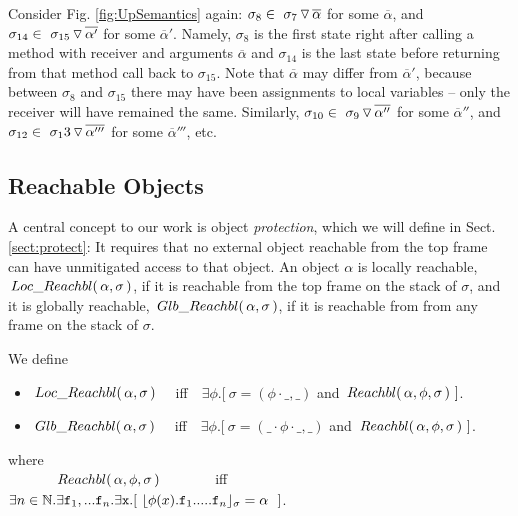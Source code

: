 {\begin{lemma}
\end{lemma}

 

 {Consider Fig. \ref{fig:UpSemantics} again: $\sigma_8\in   \PushS  {\alpha} {\sigma_7}$ for some $\overline \alpha$, and 
 $\sigma_{14}\in\PushS  {\alpha'} {\sigma_{15}}$ for some $\overline \alpha'$. Namely, $\sigma_8$ is the first state right after calling a method with receiver and
 arguments $\overline \alpha$ and $\sigma_{14}$ is the last state before returning from that method call back to $\sigma_{15}$.
Note that $\overline \alpha$ may differ from $\overline \alpha'$, because between $\sigma_8$ and $\sigma_{15}$ there may 
have been assignments to local variables -- only the receiver will have remained the same.
Similarly, 
 $\sigma_{10}\in\PushS  {\alpha''} {\sigma_9}$ for some $\overline \alpha''$, and  $\sigma_{12}\in\PushS  {\alpha'''} {\sigma_13}$ for some $\overline \alpha'''$, etc.
}


  \subsection{{Reachable  Objects}}

 {A central concept to our work is object \emph{protection}, which we will define in   Sect. \ref{sect:protect}: It requires that no external object  
reachable from the top frame  can have unmitigated access to that object.}
%
%
An object $\alpha$ is  locally reachable, $ \LRelevant \alpha \sigma $, if it is reachable from the top frame on the stack of $\sigma$,
and it is globally reachable, $\GRelevant \alpha \sigma$, if it is reachable from from any  frame on the stack of $\sigma$.
 
\begin{definition} We define 
\begin{itemize}
\item
$ \LRelevant \alpha \sigma $ \ \ iff\ \  
$\exists \phi.[\ \sigma=(\phi\cdot\_, \_)$ and $\Relevant \alpha \phi \sigma\ ]$. %
\item
$\GRelevant \alpha \sigma$  \ \ iff\ \  
$\exists \phi.[\ \sigma=(\_\cdot\phi\cdot\_, \_)$ and $\Relevant \alpha \phi \sigma\ ]$. %
\end{itemize}
where\\
$\strut\ \ \ \  \ \ \ \ \ \ \Relevant \alpha \phi \sigma $  \ \ \ \ \ \ \ iff\ \  
$\exists n\in \mathbb{N}.\exists \prg{f}_1,... \prg{f}_n.\exists \prg{x}.[ \ \interpret{\sigma}{\phi(x).\prg{f}_1.....\prg{f}_n} = \alpha \ \ ]$.


\end{definition}}
